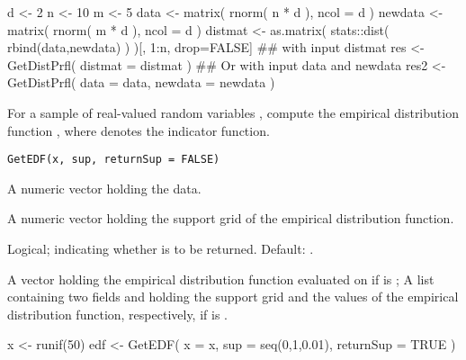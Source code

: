\documentclass[a4paper]{book}
\begin{document}
%
\begin{Examples}
\begin{ExampleCode}
d <- 2
n <- 10
m <- 5
data <- matrix( rnorm( n * d ), ncol = d )
newdata <- matrix( rnorm( m * d ), ncol = d )
distmat <- as.matrix( stats::dist( rbind(data,newdata) ) )[, 1:n, drop=FALSE]
## with input distmat
res <- GetDistPrfl( distmat = distmat )
## Or with input data and newdata
res2 <- GetDistPrfl( data = data, newdata = newdata )
\end{ExampleCode}
\end{Examples}
%
\begin{Description}\relax
For a sample of real-valued random variables , compute the empirical distribution function 
, 
where \eqn{\chi\{\cdot\}}{} denotes the indicator function.
\end{Description}
%
\begin{Usage}
\begin{verbatim}
GetEDF(x, sup, returnSup = FALSE)
\end{verbatim}
\end{Usage}
%
\begin{Arguments}
\begin{ldescription}
\item[\code{x}] A numeric vector holding the data.

\item[\code{sup}] A numeric vector holding the support grid of the empirical distribution function.

\item[\code{returnSup}] Logical; indicating whether  is to be returned. Default: .
\end{ldescription}
\end{Arguments}
%
\begin{Value}
A vector holding the empirical distribution function evaluated on  
if  is ; 
A list containing two fields  and  holding the support grid and 
the values of the empirical distribution function, respectively, 
if  is .
\end{Value}
%
\begin{Examples}
\begin{ExampleCode}
x <- runif(50)
edf <- GetEDF( x = x, sup = seq(0,1,0.01), returnSup = TRUE )
\end{ExampleCode}
\end{Examples}
\end{document}
